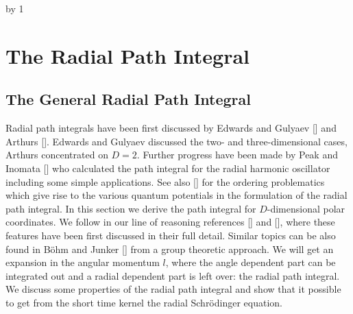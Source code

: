 \newpage
\bigskip\bigskip
{}               %
\advance\chapno by 1  %
\def\Kapitel{III.\NUM.1}
\def\Section{The Radial Path Integral}
\section{The Radial Path Integral}
\subsection{The General Radial Path Integral}
Radial path integrals have been first discussed by Edwards and
Gulyaev [\EG] and Arthurs [\ARTb].
Edwards and Gulyaev discussed the two- and three-dimensional cases,
Arthurs concentrated on $D=2$.
Further progress have been made by Peak and Inomata [\PI] who
calculated the path integral for the radial harmonic oscillator
including some simple applications.
See also [\GRSb] for the ordering
problematics which give rise to the various quantum potentials
in the formulation of the radial path integral.
In this section we derive the path integral for $D$-dimensional
polar coordinates. We follow in our line of reasoning references
[\GRSb] and [\STEc], where these features have been first discussed in
their full detail. Similar topics can be also found in B\"ohm and
Junker [\BJb] from a group theoretic approach. We will get an expansion
in the angular momentum $l$, where the angle dependent part can be
integrated out and a radial dependent part is left over: the radial
path integral. We discuss some properties of the radial path integral
and show that it possible to get from the short time kernel the
radial Schr\"odinger equation.

